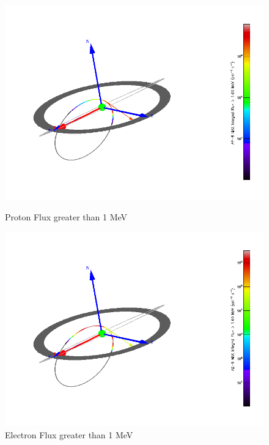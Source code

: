 \begin{figure}[!htbp]
  \centering
  \begin{minipage}[b]{0.45\textwidth}
    \includegraphics[width=\textwidth]{spenvis/proton_map}
    \caption{Proton Flux greater than 1 MeV}
    \label{fig:p_map}
  \end{minipage}
  \hfill
  \begin{minipage}[b]{0.45\textwidth}
    \includegraphics[width=\textwidth]{spenvis/electron_map}
    \caption{Electron Flux greater than 1 MeV}
    \label{fig:e_map}
  \end{minipage}
\end{figure}

